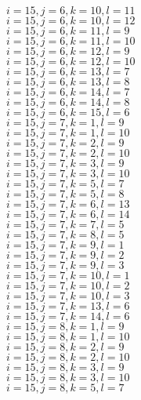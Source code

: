 \documentclass[14pt]{article}
\begin{document}
    $i=15,j=6,k=10,l=11 $ \\ 
    $i=15,j=6,k=10,l=12 $ \\ 
    $i=15,j=6,k=11,l=9 $ \\ 
    $i=15,j=6,k=11,l=10 $ \\ 
    $i=15,j=6,k=12,l=9 $ \\ 
    $i=15,j=6,k=12,l=10 $ \\ 
    $i=15,j=6,k=13,l=7 $ \\ 
    $i=15,j=6,k=13,l=8 $ \\ 
    $i=15,j=6,k=14,l=7 $ \\ 
    $i=15,j=6,k=14,l=8 $ \\ 
    $i=15,j=6,k=15,l=6 $ \\ 
    $i=15,j=7,k=1,l=9 $ \\ 
    $i=15,j=7,k=1,l=10 $ \\ 
    $i=15,j=7,k=2,l=9 $ \\ 
    $i=15,j=7,k=2,l=10 $ \\ 
    $i=15,j=7,k=3,l=9 $ \\ 
    $i=15,j=7,k=3,l=10 $ \\ 
    $i=15,j=7,k=5,l=7 $ \\ 
    $i=15,j=7,k=5,l=8 $ \\ 
    $i=15,j=7,k=6,l=13 $ \\ 
    $i=15,j=7,k=6,l=14 $ \\ 
    $i=15,j=7,k=7,l=5 $ \\ 
    $i=15,j=7,k=8,l=5 $ \\ 
    $i=15,j=7,k=9,l=1 $ \\ 
    $i=15,j=7,k=9,l=2 $ \\ 
    $i=15,j=7,k=9,l=3 $ \\ 
    $i=15,j=7,k=10,l=1 $ \\ 
    $i=15,j=7,k=10,l=2 $ \\ 
    $i=15,j=7,k=10,l=3 $ \\ 
    $i=15,j=7,k=13,l=6 $ \\ 
    $i=15,j=7,k=14,l=6 $ \\ 
    $i=15,j=8,k=1,l=9 $ \\ 
    $i=15,j=8,k=1,l=10 $ \\ 
    $i=15,j=8,k=2,l=9 $ \\ 
    $i=15,j=8,k=2,l=10 $ \\ 
    $i=15,j=8,k=3,l=9 $ \\ 
    $i=15,j=8,k=3,l=10 $ \\ 
    $i=15,j=8,k=5,l=7 $ \\ 
\end{document}
